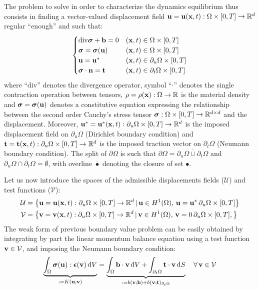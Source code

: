 \documentclass{report}
\newcommand{\bx}{\textbf{x}}
\newcommand{\bb}{\textbf{b}}
\newcommand{\bu}{\textbf{u}}
\newcommand{\bv}{\textbf{v}}
\newcommand{\bt}{\boldsymbol t}
\def\bepsilon{\mbox{\boldmath${\epsilon}$}}
\def\bsigma{\mbox{\boldmath${\sigma}$}}
\def\bb{{\bf{b}}}
\def\bn{{\bf{n}}}
\def\bx{{\bf{x}}}
\def\bt{{\bf t}}
\def\bu{{\bf{u}}}
\def\bv{{\bf{v}}}
\begin{document}
The problem to solve in order to characterize the dynamics equilibrium thus consists in finding a vector-valued displacement field $\bu=\bu(\bx,t):\Omega\times[0,T]\to\mathbb{R}^{d}$
regular ``enough'' and such that: 
\begin{equation}
\begin{cases}
\mathrm{\mathrm{div}}\bsigma+\bb=0 & (\bx,t)\in\Omega\times[0,T]\\
\bsigma=\bsigma(\bu) & (\bx,t)\in\Omega\times[0,T]\\
\bu=\bu^{*} & (\bx,t)\in\partial_{u}\Omega\times[0,T]\\
\bsigma\cdot\bn=\bt & (\bx,t)\in\partial_{t}\Omega\times[0,T]
\end{cases}
\end{equation}
where ``$\mathrm{\mathrm{div}}$'' denotes the divergence operator, symbol ``$\cdot$'' denotes the single contraction operation between tensors, $\rho=\rho(\bx):\Omega\to\mathbb{R}$ is the material density and $\bsigma=\bsigma(\bu)$ denotes a constitutive equation
expressing the relationship between the second order Cauchy's stress tensor $\bsigma:\Omega\times[0,T]\to\mathbb{R}^{d\times d}$ and the displacement. Moreover, $\bu^{*}=\bu^{*}(\bx,t):\partial_{u}\Omega\times[0,T]\to\mathbb{R}^{d}$ is the imposed displacement field on $\partial_{u}\Omega$ (Dirichlet
boundary condition) and 
$\bt=\bt(\bx,t):\partial_{u}\Omega\times[0,T]\to\mathbb{R}^{d}$
is the imposed traction vector on $\partial_{t}\Omega$ (Neumann boundary condition). The split of $\partial\Omega$ is such that $\partial\Omega=\overline{\partial_{u}\Omega\cup\partial_{t}\Omega}$ and $\partial_{u}\Omega\cap\partial_{t}\Omega=\emptyset$, with overline $\overline{\bullet}$ denoting the closure of set $\bullet$.

Let us now introduce the spaces of the admissible displacements fields ($\mathcal{U}$) and test functions ($\mathcal{V}$):
%
\begin{equation}
\begin{aligned}\mathcal{U} & =\left\{ \bu=\bu(\bx,t):\partial_{u}\Omega\times[0,T]\to\mathbb{R}^{d}\,|\,\bu\in H^{1}(\Omega),\,\bu=\bu^{*}\,\partial_{u}\Omega\times[0,T]\right\} \\
\mathcal{V} & =\left\{ \bv=\bv(\bx,t):\partial_{u}\Omega\times[0,T]\to\mathbb{R}^{d}\,|\,\bv\in H^{1}(\Omega),\,\bv=0\,\partial_{u}\Omega\times[0,T],\right\} 
\end{aligned}
\end{equation}
%
The weak form of previous boundary value problem can be easily obtained
by integrating by part the linear momentum balance equation using
a test function $\bv\in\mathcal{V}$, and imposing the Neumann boundary
condition:
%
\begin{equation}
%
\underbrace{\int_{\Omega}\bsigma(\bu):\bepsilon(\bv)\,{\rm d}V}_{:=K(\bu,\bv)}=\underbrace{\int_{\Omega}\bb\cdot\bv\,{\rm d}V+\int_{\partial_{t}\Omega}\bt\cdot\bv\,{\rm d}S}_{:=b(\bv;\bb)+b(\bv;\bt)_{\partial_{t}\Omega}}\quad\forall\,\bv\in\mathcal{V}
%
\end{equation}
\end{document}
